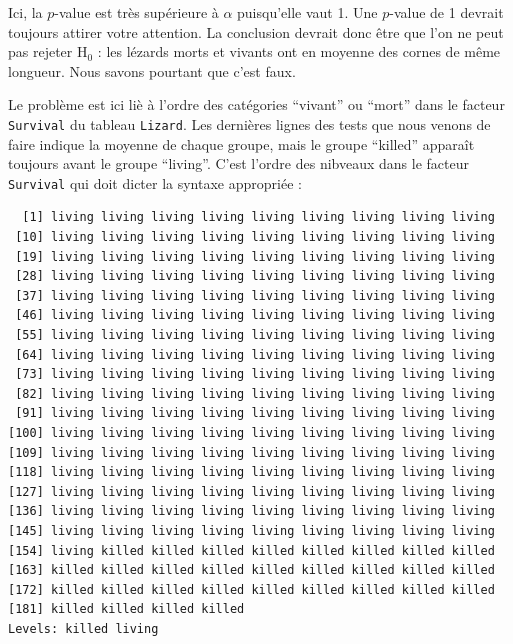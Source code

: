 \documentclass[a4paperpaper,]{article}
\newenvironment{Shaded}{\begin{snugshade}}{\end{snugshade}}
\newcommand{\NormalTok}[1]{\textcolor[rgb]{0.12,0.11,0.11}{#1}}
\newcommand{\OperatorTok}[1]{\textcolor[rgb]{0.12,0.11,0.11}{#1}}
\begin{document}
Ici, la \(p\)-value est très supérieure à \(\alpha\) puisqu'elle vaut 1. Une \(p\)-value de 1 devrait toujours attirer votre attention. La conclusion devrait donc être que l'on ne peut pas rejeter H\(_0\) : les lézards morts et vivants ont en moyenne des cornes de même longueur. Nous savons pourtant que c'est faux.

Le problème est ici liè à l'ordre des catégories ``vivant'' ou ``mort'' dans le facteur \texttt{Survival} du tableau \texttt{Lizard}. Les dernières lignes des tests que nous venons de faire indique la moyenne de chaque groupe, mais le groupe ``killed'' apparaît toujours avant le groupe ``living''. C'est l'ordre des nibveaux dans le facteur \texttt{Survival} qui doit dicter la syntaxe appropriée :

\begin{Shaded}
\end{Shaded}

\begin{verbatim}
  [1] living living living living living living living living living
 [10] living living living living living living living living living
 [19] living living living living living living living living living
 [28] living living living living living living living living living
 [37] living living living living living living living living living
 [46] living living living living living living living living living
 [55] living living living living living living living living living
 [64] living living living living living living living living living
 [73] living living living living living living living living living
 [82] living living living living living living living living living
 [91] living living living living living living living living living
[100] living living living living living living living living living
[109] living living living living living living living living living
[118] living living living living living living living living living
[127] living living living living living living living living living
[136] living living living living living living living living living
[145] living living living living living living living living living
[154] living killed killed killed killed killed killed killed killed
[163] killed killed killed killed killed killed killed killed killed
[172] killed killed killed killed killed killed killed killed killed
[181] killed killed killed killed
Levels: killed living
\end{verbatim}
\end{document}
